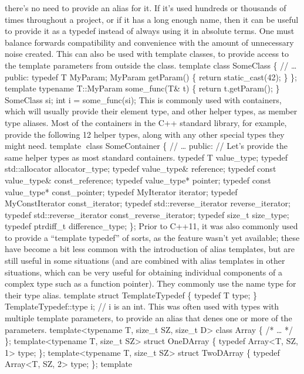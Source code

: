 there's no need to provide an alias for it. If it's used hundreds or
thousands of times throughout a project, or if it has a long enough
name, then it can be useful to provide it as a typedef instead of always
using it in absolute terms. One must balance forwards compatibility and
convenience with the amount of unnecessary noise created. This can also
be used with template classes, to provide access to the template
parameters from outside the class. template class SomeClass \{ //
\ldots{} public: typedef T MyParam; MyParam getParam() \{ return
static\_cast(42); \} \}; template typename T::MyParam some\_func(T\& t)
\{ return t.getParam(); \} SomeClass si; int i = some\_func(si); This is
commonly used with containers, which will usually provide their element
type, and other helper types, as member type aliases. Most of the
containers in the C++ standard library, for example, provide the
following 12 helper types, along with any other special types they might
need. template class SomeContainer \{ // \ldots{} public: // Let's
provide the same helper types as most standard containers. typedef T
value\_type; typedef std::allocator allocator\_type; typedef
value\_type\& reference; typedef const value\_type\& const\_reference;
typedef value\_type* pointer; typedef const value\_type* const\_pointer;
typedef MyIterator iterator; typedef MyConstIterator const\_iterator;
typedef std::reverse\_iterator reverse\_iterator; typedef
std::reverse\_iterator const\_reverse\_iterator; typedef size\_t
size\_type; typedef ptrdiff\_t difference\_type; \}; Prior to C++11, it
was also commonly used to provide a ``template typedef'' of sorts, as
the feature wasn't yet available; these have become a bit less common
with the introduction of alias templates, but are still useful in some
situations (and are combined with alias templates in other situations,
which can be very useful for obtaining individual components of a
complex type such as a function pointer). They commonly use the name
type for their type alias. template struct TemplateTypedef \{ typedef T
type; \} TemplateTypedef::type i; // i is an int. This was often used
with types with multiple template parameters, to provide an alias that
denes one or more of the parameters. template\textless typename T,
size\_t SZ, size\_t D\textgreater{} class Array \{ /* \ldots{} */ \};
template\textless typename T, size\_t SZ\textgreater{} struct OneDArray
\{ typedef Array\textless T, SZ, 1\textgreater{} type; \};
template\textless typename T, size\_t SZ\textgreater{} struct TwoDArray
\{ typedef Array\textless T, SZ, 2\textgreater{} type; \}; template
